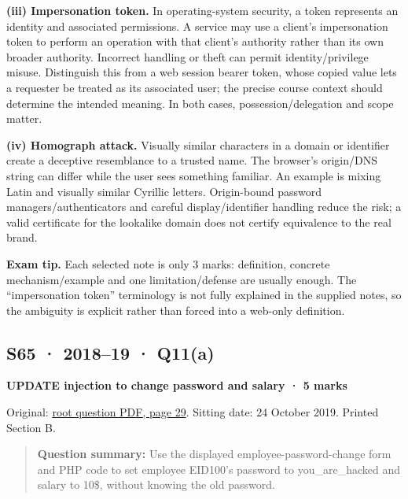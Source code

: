 \documentclass[11pt,a4paper]{article}
\begin{document}
\textbf{(iii) Impersonation token.} In operating-system security,\allowbreak{} a token represents an identity and associated permissions. A service may use a client’s impersonation token to perform an operation with that client’s authority rather than its own broader authority. Incorrect handling or theft can permit identity/\allowbreak{}privilege misuse. Distinguish this from a web session bearer token,\allowbreak{} whose copied value lets a requester be treated as its associated user; the precise course context should determine the intended meaning. In both cases,\allowbreak{} possession/\allowbreak{}delegation and scope matter.


\textbf{(iv) Homograph attack.} Visually similar characters in a domain or identifier create a deceptive resemblance to a trusted name. The browser’s origin/\allowbreak{}DNS string can differ while the user sees something familiar. An example is mixing Latin and visually similar Cyrillic letters. Origin-bound password managers/\allowbreak{}authenticators and careful display/\allowbreak{}identifier handling reduce the risk; a valid certificate for the lookalike domain does not certify equivalence to the real brand.



{\color{ForestGreen}\textbf{Exam tip.} Each selected note is only 3 marks: definition,\allowbreak{} concrete mechanism/\allowbreak{}example and one limitation/\allowbreak{}defense are usually enough. The “impersonation token” terminology is not fully explained in the supplied notes,\allowbreak{} so the ambiguity is explicit rather than forced into a web-only definition.}




\clearpage
\subsection{S65 · 2018–19 · Q11(a)}\label{s65}

\textbf{UPDATE injection to change password and salary · 5 marks}


Original: \href{../../CSE405-Security_Merged.pdf\#page=29}{root question PDF,\allowbreak{} page 29}. Sitting date: 24 October 2019. Printed Section B.



\begin{quote}\small

\textbf{Question summary:} Use the displayed employee-password-change form and PHP code to set employee EID100’s password to you\_are\_hacked and salary to 10\$,\allowbreak{} without knowing the old password.



\end{quote}
\end{document}
